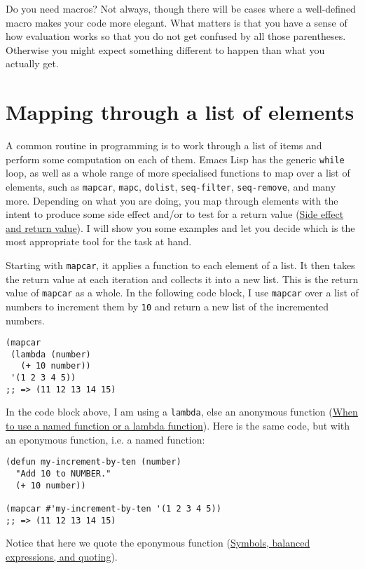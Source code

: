 \documentclass[11pt]{ctexart}
\begin{document}
Do you need macros? Not always, though there will be cases where a well-defined macro makes your code more elegant. What matters is that you have a sense of how evaluation works so that you do not get confused by all those parentheses. Otherwise you might expect something different to happen than what you actually get.
\section{Mapping through a list of elements}
\label{sec:org29370c2}
A common routine in programming is to work through a list of items and perform some computation on each of them. Emacs Lisp has the generic \texttt{while} loop, as well as a whole range of more specialised functions to map over a list of elements, such as \texttt{mapcar}, \texttt{mapc}, \texttt{dolist}, \texttt{seq-filter}, \texttt{seq-remove}, and many more. Depending on what you are doing, you map through elements with the intent to produce some side effect and/or to test for a return value (\hyperref[sec:org2689823]{Side effect and return value}). I will show you some examples and let you decide which is the most appropriate tool for the task at hand.

Starting with \texttt{mapcar}, it applies a function to each element of a list. It then takes the return value at each iteration and collects it into a new list. This is the return value of \texttt{mapcar} as a whole. In the following code block, I use \texttt{mapcar} over a list of numbers to increment them by \texttt{10} and return a new list of the incremented numbers.

\begin{verbatim}
(mapcar
 (lambda (number)
   (+ 10 number))
 '(1 2 3 4 5))
;; => (11 12 13 14 15)
\end{verbatim}

In the code block above, I am using a \texttt{lambda}, else an anonymous function (\hyperref[sec:org1669468]{When to use a named function or a lambda function}). Here is the same code, but with an eponymous function, i.e. a named function:

\begin{verbatim}
(defun my-increment-by-ten (number)
  "Add 10 to NUMBER."
  (+ 10 number))

(mapcar #'my-increment-by-ten '(1 2 3 4 5))
;; => (11 12 13 14 15)
\end{verbatim}

Notice that here we quote the eponymous function (\hyperref[sec:org9b7817a]{Symbols, balanced expressions, and quoting}).
\end{document}
